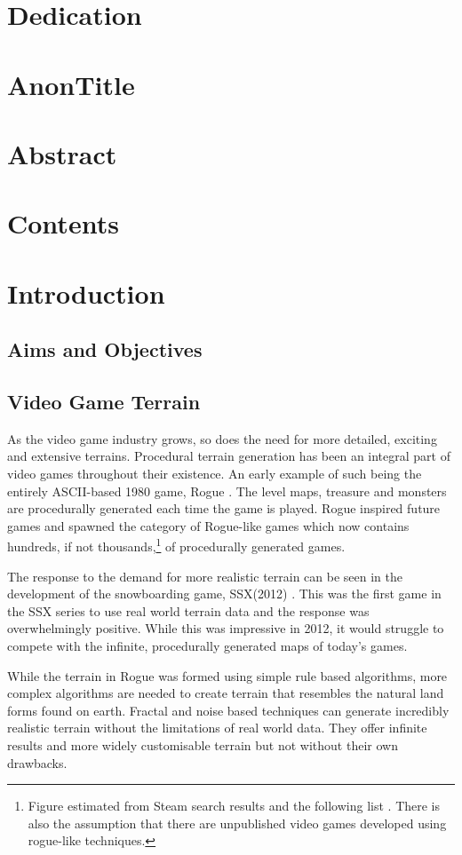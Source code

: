 \documentclass[a4paper]{report}
\begin{document}

\section{Dedication}
\section{AnonTitle}
\section{Abstract}
\section{Contents}
\section{Introduction}

\subsection{Aims and Objectives}
\subsection{Video Game Terrain}
As the video game industry grows, so does the need for more detailed, exciting and extensive terrains. Procedural terrain generation has been an integral part of video games throughout their existence. An early example of such being the entirely ASCII-based 1980 game, Rogue \cite{rogue}. The level maps, treasure and monsters are procedurally generated each time the game is played. Rogue inspired future games and spawned the category of Rogue-like games which now contains hundreds, if not thousands,\footnote{Figure estimated from Steam search results \cite{roguelikeSteam} and the following list \cite{roguebasin_2020}. There is also the assumption that there are unpublished video games developed using rogue-like techniques.} of procedurally generated games.

The response to the demand for more realistic terrain can be seen in the development of the snowboarding game, SSX(2012) \cite{SSX}. This was the first game in the SSX series to use real world terrain data and the response was overwhelmingly positive. While this was impressive in 2012, it would struggle to compete with the infinite, procedurally generated maps of today's games.

While the terrain in Rogue was formed using simple rule based algorithms, more complex algorithms are needed to create terrain that resembles the natural land forms found on earth. Fractal and noise based techniques can generate incredibly realistic terrain without the limitations of real world data. They offer infinite results and more widely customisable terrain but not without their own drawbacks.
\end{document}

